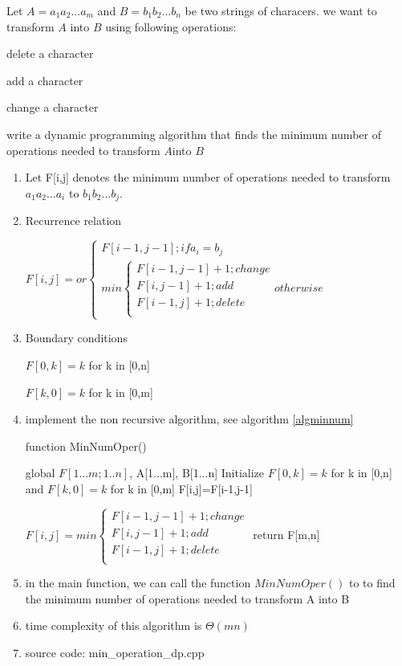 \documentclass[12pt]{article}
\newenvironment{question}[2][Question]{\begin{trivlist}
\item[\hskip \labelsep {\bfseries #1}\hskip \labelsep {\bfseries #2.}]}{\end{trivlist}}
\begin{document}
\begin{question}{2}
Let $A=a_1a_2...a_m$ and $B=b_1b_2...b_n$ be two strings of characers. we
want to transform $A$ into $B$ using following operations:

delete a character

add a character

change a character

write a dynamic programming algorithm that finds the minimum number of operations needed to transform $A $into $B$
\end{question}
\begin{enumerate}
\item Let F[i,j] denotes the minimum number of operations needed to transform $a_1a_2...a_i$ to $b_1b_2...b_j$.
\item Recurrence relation

$
F[i,j]=or
\begin{cases}
F[i-1,j-1]; if a_i=b_j\\
min
\begin{cases}
F[i-1,j-1]+1; change\\
F[i,j-1]+1; add\\
F[i-1,j]+1; delete\\
\end{cases}
otherwise
\end{cases}
$

\item Boundary conditions

$F[0,k]=k$ for k in [0,n]

$F[k,0]=k$ for k in [0,m]
 
 \item implement the non recursive algorithm, see algorithm \ref{algminnum}

\begin{algorithm}[H]
\caption{function MinNumOper() }
\label{algminnum}
\begin{algorithmic}[1]
\State global $F[1...m;1..n]$, A[1...m], B[1...n]
\State Initialize $F[0,k]=k$ for k in [0,n] and $F[k,0]=k$ for k in [0,m]
        	 F[i,j]=F[i-1,j-1]
	\Else
	
	$
F[i,j]=min
\begin{cases}
F[i-1,j-1]+1; change\\
F[i,j-1]+1; add\\
F[i-1,j]+1; delete\\
\end{cases}
$
	\EndIf		
       \EndFor
\EndFor
 \State return F[m,n]
\end{algorithmic}
\end{algorithm} 
\item in the main function, we can call the function $MinNumOper()$ to to find the minimum number of operations needed to transform A into B
\item time complexity of this algorithm is $\Theta(mn)$
\item source code: min\_operation\_dp.cpp
\end{enumerate}
 
\end{document}
